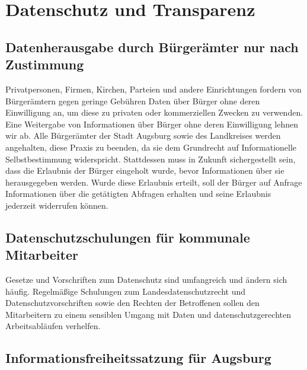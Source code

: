 \chapter{Datenschutz und Transparenz}

  \section{Datenherausgabe durch Bürgerämter nur nach Zustimmung}
  
  Privatpersonen, Firmen, Kirchen, Parteien und andere Einrichtungen fordern 
  von Bürgerämtern gegen geringe Gebühren Daten über Bürger ohne deren 
  Einwilligung an, um diese zu privaten oder kommerziellen Zwecken zu 
  verwenden. Eine Weitergabe von Informationen über Bürger ohne deren 
  Einwilligung lehnen wir ab. Alle Bürgerämter der Stadt Augsburg sowie des 
  Landkreises werden angehalten, diese Praxis zu beenden, da sie dem 
  Grundrecht auf Informationelle Selbstbestimmung widerspricht. Stattdessen 
  muss in Zukunft sichergestellt sein, dass die Erlaubnis der Bürger eingeholt 
  wurde, bevor Informationen über sie herausgegeben werden. Wurde diese 
  Erlaubnis erteilt, soll der Bürger auf Anfrage Informationen über die 
  getätigten Abfragen erhalten und seine Erlaubnis jederzeit widerrufen 
  können. 
  
  \section{Datenschutzschulungen für kommunale Mitarbeiter}
  
  Gesetze und Vorschriften zum Datenschutz sind umfangreich und ändern sich 
  häufig. Regelmäßige Schulungen zum Landesdatenschutzrecht und 
  Datenschutzvorschriften sowie den Rechten der Betroffenen sollen den 
  Mitarbeitern zu einem sensiblen Umgang mit Daten und datenschutzgerechten 
  Arbeitsabläufen verhelfen.
  
  \section{Informationsfreiheitssatzung für Augsburg}
  
